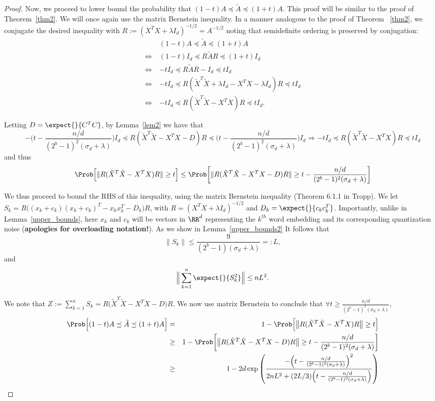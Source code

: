 \documentclass[12pt]{article}
\newcommand{\tA}{\tilde{A}}
\newcommand{\tX}{\tilde{X}}
\newcommand{\defeq}{:=}
\newcommand{\eqdef}{=:}
\begin{document}
\begin{proof}
Now, we proceed to lower bound the probability that $(1-t)A \preceq \tA \preceq (1+t)A$.  This proof will be similar to the proof of Theorem~\ref{thm2}. We will once again use the matrix Bernstein inequality. In a manner analogous to the proof of Theorem ~\ref{thm2}, we conjugate the desired inequality with $R \defeq (X^T X + \lambda I_d)^{-1/2} = A^{-1/2}$ noting that semidefinite ordering is preserved by conjugation:
\begin{align*}
&(1 - t) A \preceq \tA \preceq (1 + t) A \\
\iff\ &(1 - t) I_d \preceq R \tA R \preceq (1 + t) I_d \\
\iff\ &-t I_d \preceq R \tA R - I_d \preceq t I_d \\
\iff\ &-t I_d \preceq R (\tX^T \tX + \lambda I_d - X^T X - \lambda I_d) R \preceq t I_d \\
\iff\ &-t I_d \preceq R (\tX^T \tX - X^T X) R \preceq t I_d.
\end{align*}

Letting $D=\expect{}{C^TC}$, by Lemma~\ref{lem2} we have that 
$$-\Big(t - \frac{n/d}{(2^b-1)^2(\sigma_d + \lambda)}\Big) I_d \preceq R (\tX^T \tX - X^T X - D) R \preceq
\Big(t - \frac{n/d}{(2^b-1)^2(\sigma_d + \lambda)}\Big) I_d 
\Longrightarrow -t I_d \preceq R (\tX^T \tX - X^T X) R \preceq
t I_d$$
and thus
$$\Prob\Big[ \|R (\tX^T \tX - X^T X) R\| \geq t\Big] \leq  \Prob\bigg[ \|R (\tX^T \tX - X^T X -D) R\| \geq t-\frac{n/d}{(2^b-1)^2(\sigma_d + \lambda)}\bigg]  $$

We thus proceed to bound the RHS of this inequality, using the matrix Bernstein inequality (Theorem 6.1.1 in Tropp).  We let $S_k = R\Big((x_k + c_k)(x_k + c_k)^T  - x_k x_k^T - D_k\Big)R$, with $R=(X^T X+\lambda I_d)^{-1/2}$ and $D_k = \expect{}{c_kc_k^T}$. Importantly, unlike in Lemma~\ref{upper_bounds}, here $x_k$ and $c_k$ will be vectors in $\RR^d$ representing the $k^{th}$ word embedding and its corresponding quantization noise (\textbf{apologies for overloading notation!}).  As we show in Lemma~\ref{upper_bounds2}
It follows that
$$\|S_k\| \leq \frac{9}{(2^b-1)(\sigma_d + \lambda)} \eqdef L,$$
and
$$\Big\|\sum_{k=1}^n \expect{}{S_k^2}\Big\| \leq nL^2.$$

We note that $Z\defeq \sum_{k=1}^n S_k = R\Big(\tX^T \tX - X^T X - D\Big)R$.  We now use matrix Bernstein to conclude that $\forall t \geq \frac{n/d}{(2^b-1)^2(\sigma_d + \lambda)}$, 
\begin{eqnarray*}
\Prob\Big[ (1 - t) A \preceq \tA \preceq (1 + t) A\Big] &=& 
1- \Prob\Big[\big\|R (\tX^T \tX - X^T X) R\big\| \geq t\Big]\\ 
&\geq& 1- \Prob\bigg[ \big\|R (\tX^T \tX - X^T X -D) R\big\| \geq t-\frac{n/d}{(2^b-1)^2(\sigma_d + \lambda)}\bigg] \\
&\geq& 1- 2d \exp \left(\frac{-\Big(t-\frac{n/d}{(2^b-1)^2(\sigma_d + \lambda)}\Big)^2}{2nL^2 + (2L/3)\Big(t-\frac{n/d}{(2^b-1)^2(\sigma_d + \lambda)}\Big)} \right)
\end{eqnarray*}
\end{proof}
\end{document}
